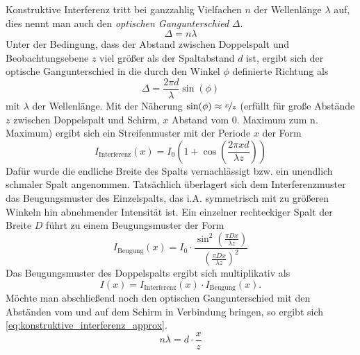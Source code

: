 \documentclass[ngerman]{scrartcl}
\begin{document}
Konstruktive Interferenz tritt bei ganzzahlig Vielfachen $n$ der Wellenlänge $\lambda$ auf, dies nennt man auch den \textit{optischen Gangunterschied} $\Delta$.
\begin{equation}
    \label{eq:konstruktive_interferenz}
    \Delta = n \lambda
\end{equation}
Unter der Bedingung, dass der Abstand zwischen Doppelspalt und Beobachtungsebene $z$ viel größer als der Spaltabstand $d$ ist, ergibt sich der optische Gangunterschied in die durch den Winkel $\phi$ definierte Richtung als
\begin{equation}
    \label{eq:optischer_gangunterschied}
    \Delta = \frac{2 \pi d}{\lambda} \sin(\phi)
\end{equation}
mit $\lambda$ der Wellenlänge.
Mit der Näherung $\sin(\phi) \approx \nicefrac{x}{z}$ (erfüllt für große Abstände $z$ zwischen Doppelspalt und Schirm, $x$ Abstand vom 0. Maximum zum n. Maximum) ergibt sich ein Streifenmuster mit der Periode $x$ der Form
\begin{equation}
    \label{eq:intensity_interferenz}
    I_{\text{Interferenz}}(x) = I_0 \left(1 + \cos(\frac{2 \pi x d}{\lambda z}) \right)
\end{equation}
Dafür wurde die endliche Breite des Spalts vernachlässigt bzw. ein unendlich schmaler Spalt angenommen. Tatsächlich überlagert sich dem Interferenzmuster das Beugungsmuster des Einzelspalts, das i.A. symmetrisch mit zu größeren Winkeln hin abnehmender Intensität ist. Ein einzelner rechteckiger Spalt der Breite $D$ führt zu einem Beugungsmuster der Form
\begin{equation}
    \label{eq:intensity_beugung}
    I_{\text{Beugung}}(x) = I_0 \cdot \frac{\sin^2(\frac{\pi D x}{\lambda z})}{\left(\frac{\pi D x}{\lambda z}\right)^2}
\end{equation}
Das Beugungsmuster des Doppelspalts ergibt sich multiplikativ als
\begin{equation}
    \label{eq:intensity_gesamt}
    I(x) = I_{\text{Interferenz}}(x) \cdot I_{\text{Beugung}}(x).
\end{equation}
Möchte man abschließend noch den optischen Gangunterschied mit den Abständen vom und auf dem Schirm in Verbindung bringen, so ergibt sich \autoref{eq:konstruktive_interferenz_approx}.
\begin{equation}
    \label{eq:konstruktive_interferenz_approx}
    n \lambda = d \cdot \frac{x}{z}
\end{equation}
\end{document}
